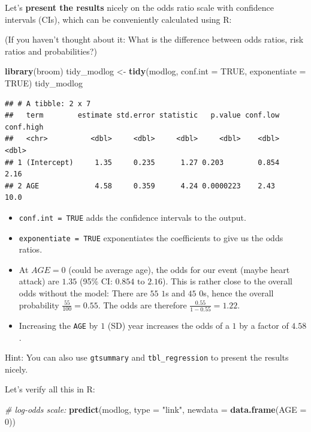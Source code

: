 \documentclass[
]{book}
\newenvironment{Shaded}{\begin{snugshade}}{\end{snugshade}}
\newcommand{\AttributeTok}[1]{\textcolor[rgb]{0.13,0.29,0.53}{#1}}
\newcommand{\CommentTok}[1]{\textcolor[rgb]{0.56,0.35,0.01}{\textit{#1}}}
\newcommand{\ConstantTok}[1]{\textcolor[rgb]{0.56,0.35,0.01}{#1}}
\newcommand{\DecValTok}[1]{\textcolor[rgb]{0.00,0.00,0.81}{#1}}
\newcommand{\FunctionTok}[1]{\textcolor[rgb]{0.13,0.29,0.53}{\textbf{#1}}}
\newcommand{\NormalTok}[1]{#1}
\newcommand{\OtherTok}[1]{\textcolor[rgb]{0.56,0.35,0.01}{#1}}
\newcommand{\StringTok}[1]{\textcolor[rgb]{0.31,0.60,0.02}{#1}}
\providecommand{\tightlist}{%
  \setlength{\itemsep}{0pt}\setlength{\parskip}{0pt}}
\begin{document}
Let's \textbf{present the results} nicely on the odds ratio scale with
confidence intervals (CIs), which can be conveniently calculated using R:

(If you haven't thought about it:
What is the difference between odds ratios, risk ratios and probabilities?)

\begin{Shaded}
\begin{Highlighting}[]
\FunctionTok{library}\NormalTok{(broom)}
\NormalTok{tidy\_modlog }\OtherTok{\textless{}{-}} \FunctionTok{tidy}\NormalTok{(modlog, }\AttributeTok{conf.int =} \ConstantTok{TRUE}\NormalTok{, }\AttributeTok{exponentiate =} \ConstantTok{TRUE}\NormalTok{)}
\NormalTok{tidy\_modlog}
\end{Highlighting}
\end{Shaded}

\begin{verbatim}
## # A tibble: 2 x 7
##   term        estimate std.error statistic   p.value conf.low conf.high
##   <chr>          <dbl>     <dbl>     <dbl>     <dbl>    <dbl>     <dbl>
## 1 (Intercept)     1.35     0.235      1.27 0.203        0.854      2.16
## 2 AGE             4.58     0.359      4.24 0.0000223    2.43      10.0
\end{verbatim}

\begin{itemize}
\tightlist
\item
  \texttt{conf.int\ =\ TRUE} adds the confidence intervals to the output.
\item
  \texttt{exponentiate\ =\ TRUE} exponentiates the coefficients to give us the odds ratios.
\item
  At \(AGE=0\) (could be average age), the odds for our event (maybe heart attack) are
  \(1.35\) (95\% CI: \(0.854\text{ to }2.16\)).
  This is rather close to the overall odds without the model:
  There are \(55\) \(1\)s and \(45\) \(0\)s, hence the overall probability \(\frac{55}{100} = 0.55\).
  The odds are therefore \(\frac{0.55}{1-0.55} = 1.22\).
\item
  Increasing the \texttt{AGE} by \(1\) (SD) year increases the odds of a \(1\) by a factor of
  \(4.58\).
\end{itemize}

Hint: You can also use \texttt{gtsummary} and \texttt{tbl\_regression} to present the results nicely.

Let's verify all this in R:

\begin{Shaded}
\begin{Highlighting}[]
\CommentTok{\# log{-}odds scale:}
\FunctionTok{predict}\NormalTok{(modlog, }\AttributeTok{type =} \StringTok{"link"}\NormalTok{,}
        \AttributeTok{newdata =} \FunctionTok{data.frame}\NormalTok{(}\AttributeTok{AGE =} \DecValTok{0}\NormalTok{))}
\end{Highlighting}
\end{Shaded}
\end{document}
